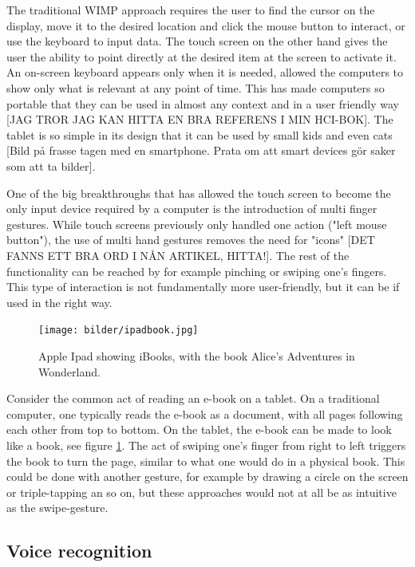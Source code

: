 The traditional WIMP approach requires the user to find the cursor on the display, move it to the desired location and click the mouse button to interact, or use the keyboard to input data. The touch screen on the other hand gives the user the ability to point directly at the desired item at the screen to activate it. An on-screen keyboard appears only when it is needed, allowed the computers to show only what is relevant at any point of time. This has made computers so portable that they can be used in almost any context and in a user friendly way [JAG TROR JAG KAN HITTA EN BRA REFERENS I MIN HCI-BOK]. The tablet is so simple in its design that it can be used by small kids and even cats [Bild på frasse tagen med en smartphone. Prata om att smart devices gör saker som att ta bilder].

One of the big breakthroughs that has allowed the touch screen to become the only input device required by a computer is the introduction of multi finger gestures. While touch screens previously only handled one action ("left mouse button"), the use of multi hand gestures removes the need for "icons" [DET FANNS ETT BRA ORD I NÅN ARTIKEL, HITTA!]. The rest of the functionality can be reached by for example pinching or swiping one's fingers. This type of interaction is not fundamentally more user-friendly, but it can be if used in the right way.

\begin{figure}[]
\texttt{[image: bilder/ipadbook.jpg]}
\caption{Apple Ipad showing iBooks, with the book Alice's Adventures in Wonderland.}
\label{ibooks}
\end{figure}
\nocite{ipadbook}

Consider the common act of reading an e-book on a tablet. On a traditional computer, one typically reads the e-book as a document, with all pages following each other from top to bottom. On the tablet, the e-book can be made to look like a book, see figure \ref{ibooks}. The act of swiping one's finger from right to left triggers the book to turn the page, similar to what one would do in a physical book. This could be done with another gesture, for example by drawing a circle on the screen or triple-tapping an so on, but these approaches would not at all be as intuitive as the swipe-gesture.


\subsection{Voice recognition}

